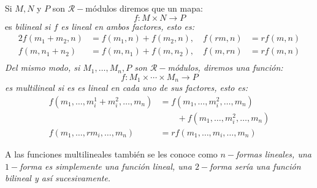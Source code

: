 \begin{definition}
	Si $M, N$ y $P$ son $\mathcal{R}-$módulos diremos que un mapa:
	\[
		f: M \times N \to P
	\]
	es \it{bilineal} si $f$ es lineal en ambos factores, esto es:
	\begin{alignat*}{2}
		f(m_1 + m_2, n) & = f(m_1,n) + f(m_2,n),\quad  f(rm,n) & = rf(m,n) \\
		f(m, n_1 + n_2) & = f(m,n_1) + f(m,n_2),\quad  f(m,rn) & = rf(m,n) \\
	\end{alignat*}
	Del mismo modo, si $M_1, \ldots, M_n, P$ son $\mathcal{R}-$módulos, diremos una función:
	\[
		f: M_1 \times \cdots \times M_n \to P
	\]
	es \it{multilineal} si es es lineal en cada uno de sus factores, esto es:
	\begin{align*}
		f(m_1, \ldots, m_i^1 + m_i^2, \ldots, m_n) & = f(m_1, \ldots, m_i^2, \ldots, m_n)           \\
		                                           & \quad\quad +f(m_1, \ldots, m_i^2, \ldots, m_n) \\
		f(m_1,\ldots , rm_i, \ldots, m_n)          & = r f(m_1,\ldots,m_i,\ldots, m_n)
	\end{align*}
\end{definition}

A las funciones multilineales también se les conoce como \it{$n-$formas lineales}, una $1-$forma es simplemente una función lineal, una $2-$forma sería una función bilineal y así sucesivamente.

